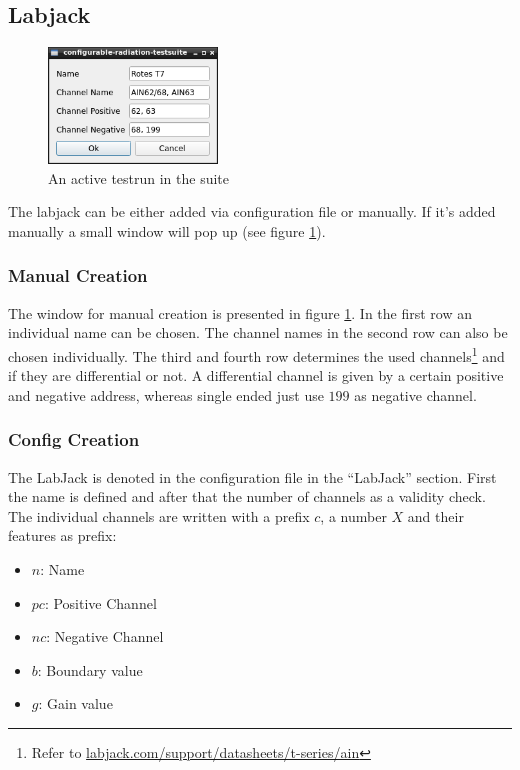 \documentclass[10pt,a4paper]{article}
\begin{document}
	\subsection{Labjack}
	
	\begin{figure}[H]
	\centering
	\includegraphics[width=0.4\textwidth]{./3_LBJ_menu.png}
	\caption{An active testrun in the suite}
	\label{f:lbj_menu}
	\end{figure}
	
	The labjack can be either added via configuration file or manually. If it's added manually a small window will pop up (see figure \ref{f:lbj_menu}).
	
	\subsubsection{Manual Creation}	
	
	The window for manual creation is presented in figure \ref{f:lbj_menu}. In the first row an individual name can be chosen. The channel names in the second row can also be chosen individually. The third and fourth row determines the used channels\footnote{Refer to \url{labjack.com/support/datasheets/t-series/ain}} and if they are differential or not. A differential channel is given by a certain positive and negative address, whereas single ended just use $199$ as negative channel.
	
	\subsubsection{Config Creation}	
	The LabJack is denoted in the configuration file in the \enquote{LabJack} section. First the name is defined and after that the number of channels as a validity check. The individual channels are written with a prefix $c$, a number $X$ and their features as prefix:
	
	\begin{itemize}
	\item $n$: Name
	\item $pc$: Positive Channel
	\item $nc$: Negative Channel
	\item $b$: Boundary value
	\item $g$: Gain value
	\end{itemize}
	
\end{document}
